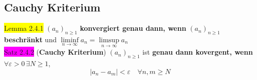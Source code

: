 \documentclass[landscape, 10pt]{article}
\begin{document}
\begin{multicols}{3}
       \subsection{Cauchy Kriterium}
              \colorbox{yellow}{Lemma 2.4.1} 
                     \textcolor{NavyBlue}{$(a_n)_{n\geqslant1}$} 
                     \textbf{konvergiert genau dann, wenn} 
                     \textcolor{NavyBlue}{$(a_n)_{n\geqslant1}$} 
                     \textbf{beschränkt} und 
                     \textcolor{NavyBlue}{$\liminf\limits_{n\to\infty}a_n
                     =\limsup\limits_{n\to\infty}a_n$}\\
              \colorbox{magenta}{Satz 2.4.2} 
              (\textbf{Cauchy Kriterium})
                     \textcolor{NavyBlue}{$(a_n)_{n\geqslant1}$} ist
                     \textbf{genau dann kovergent, wenn} 
                     \textcolor{NavyBlue}{
                     $\forall\varepsilon >0\,\exists N\geqslant1$}, 
                     \begin{equation*}
                            |a_n-a_m|<\varepsilon\quad
                            \forall n,m\geqslant N
                     \end{equation*}

\end{multicols}
\end{document}
